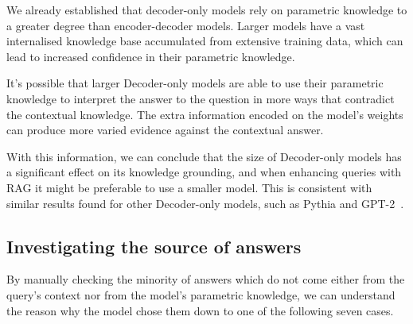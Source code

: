 We already established that decoder-only models rely on parametric knowledge to a greater degree than encoder-decoder models.
Larger models have a vast internalised knowledge base accumulated from extensive training data, which can lead to increased confidence in their parametric knowledge.

It's possible that larger Decoder-only models are able to use their parametric knowledge to interpret the answer to the question in more ways that contradict the contextual knowledge.
The extra information encoded on the model's weights can produce more varied evidence against the contextual answer.

With this information, we can conclude that the size of Decoder-only models has a significant effect on its knowledge grounding, and when enhancing queries with RAG it might be preferable to use a smaller model.
This is consistent with similar results found for other Decoder-only models, such as Pythia and GPT-2~\cite{factual_recall}.

\subsection{Investigating the source of \Other{} answers}
\label{what_are_all_these_others}

By manually checking the minority of answers which do not come either from the query's context nor from the model's parametric knowledge, we can understand the reason why the model chose them down to one of the following seven cases.

